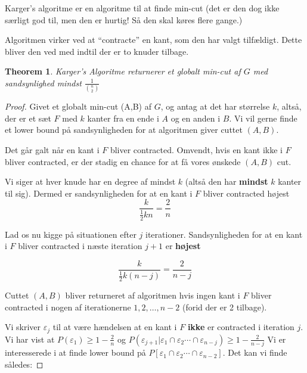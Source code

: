 \documentclass[11pt]{article}
\newtheorem{theorem}{Theorem}
\theoremstyle{definition}
\theoremstyle{remark}
\begin{document}
Karger's algoritme er en algoritme til at finde min-cut (det er den dog ikke særligt god til, men den er hurtig! Så den skal køres flere gange.)

Algoritmen virker ved at ``contracte'' en kant, som den har valgt tilfældigt. Dette bliver den ved med indtil der er to knuder tilbage. 

\begin{theorem}
  Karger's Algoritme returnerer et globalt min-cut af $G$ med sandsynlighed mindst $\frac{1}{\binom{n}{2}}$

\end{theorem}

\begin{proof}
Givet et globalt min-cut (A,B) af $G$, og antag at det har størrelse $k$, altså, der er et sæt $F$ med $k$ kanter fra en ende i $A$ og en anden i $B$. Vi vil gerne finde et lower bound på sandsynligheden for at algoritmen giver cuttet $(A,B)$.

Det går galt når en kant i $F$ bliver contracted. Omvendt, hvis en kant ikke i $F$ bliver contracted, er der stadig en chance for at få vores ønskede $(A,B)$ cut.

Vi siger at hver knude har en degree af mindst $k$ (altså den har \textbf{mindst} $k$ kanter til sig). Dermed er sandsynligheden for at en kant i $F$ bliver contracted højest
\[ \frac{k}{\frac{1}{2}kn} = \frac{2}{n} \]

Lad os nu kigge på situationen efter $j$ iterationer. Sandsynligheden for at en kant i $F$ bliver contracted i næste iteration $j+1$ er \textbf{højest}

\[ \frac{k}{\frac{1}{2}k(n-j)} = \frac{2}{n-j} \]

Cuttet $(A,B)$ bliver returneret af algoritmen hvis ingen kant i $F$ bliver contracted i nogen af iterationerne $1, 2, \ldots, n-2$ (forid der er 2 tilbage).

Vi skriver $\varepsilon_{j}$ til at være hændelsen at en kant i $F$ \textbf{ikke} er contracted i iteration $j$. Vi har vist at $P(\varepsilon_{1}) \geq 1 - \frac{2}{n}$ og $P(\varepsilon_{j+1}|\varepsilon_{1} \cap \varepsilon_{2} \cdots \cap \varepsilon_{n-j}) \geq 1 - \frac{2}{n-j}$
Vi er interesserede i at finde lower bound på $P[\varepsilon_{1} \cap \varepsilon_{2} \cdots \cap \varepsilon_{n-2}]$. Det kan vi finde således:


\end{proof}
\end{document}
